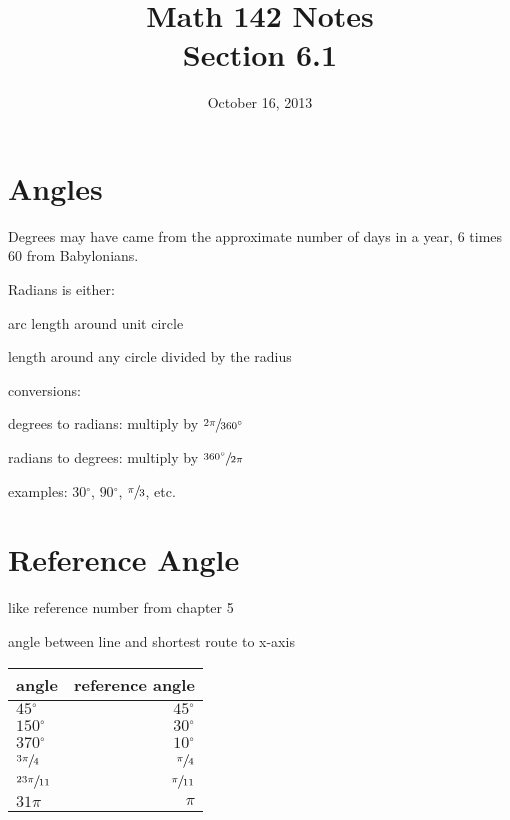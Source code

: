 \documentclass{exam}
\title{Math 142 Notes \\ Section 6.1}
\date{October 16, 2013}
\newcommand{\dg}{\ensuremath{^\circ}}
\begin{document}
  \maketitle
  \tableofcontents

  \section{Angles}

  Degrees may have came from the approximate number of days in a year, 6 times 60 from Babylonians.

  Radians is either:
  \begin{itemize*}
    \item arc length around unit circle
    \item length around any circle divided by the radius
  \end{itemize*}

  conversions:
  \begin{itemize*}
    \item degrees to radians: multiply by $\sfrac{2 \pi}{360 \dg}$
    \item radians to degrees: multiply by $\sfrac{360 \dg}{2 \pi}$
  \end{itemize*}

  examples: $30\dg$, $90\dg$, $\sfrac{\pi}{3}$, etc.

  \section{Reference Angle}
  \begin{itemize*}
    \item like reference number from chapter 5
    \item angle between line and shortest route to x-axis
  \end{itemize*}

  \begin{tabular}[H]{lr}
    \toprule
    angle                & reference angle \\
    \midrule
    $45 \dg$             & $45 \dg$ \\
    $150 \dg$            & $30 \dg$ \\
    $370 \dg$            & $10 \dg$ \\
    $\sfrac{3 \pi}{4}$   & $\sfrac{\pi}{4}$ \\
    $\sfrac{23 \pi}{11}$ & $\sfrac{\pi}{11}$ \\
    $31 \pi$             & $\pi$ \\
    \bottomrule
  \end{tabular}
\end{document}
